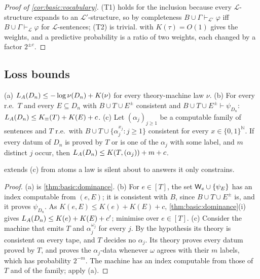 \begin{proof}[Proof of \cref{cor:basic:vocabulary}]
(T1) holds for the inclusion because every $\mathcal L$-structure expands to an $\mathcal L'$-structure, so by completeness $B\cup\Gamma\vdash_{\mathcal L'}\varphi$ iff $B\cup\Gamma\vdash_{\mathcal L}\varphi$ for $\mathcal L$-sentences; (T2) is trivial.  with $K(\tau)=O(1)$ gives the weights, and a predictive probability is a ratio of two weights, each changed by a factor $2^{\pm c}$.
\end{proof}

\subsection{Loss bounds}\label{app:basic:loss}

\begin{proposition}\label{prop:basic:exceptions}
(a) $L_{A}(D_n)\le-\log\nu(D_n)+K(\nu)$ for every theory-machine law $\nu$. (b) For every r.e.\ $T$ and every $E\subseteq D_n$ with $B\cup T\cup E^\pm$ consistent and $B\cup T\cup E^\pm\vdash\psi_{D_n}$: $L_{A}(D_n)\le K_{\equiv}(T)+K(E)+c$. (c) Let $(\alpha_j)_{j\ge1}$ be a computable family of sentences and $T$ r.e.\ with $B\cup T\cup\{\alpha_j^{x_j}:j\ge1\}$ consistent for every $x\in\{0,1\}^{\mathbb N}$. If every datum of $D_n$ is proved by $T$ or is one of the $\alpha_j$ with some label, and $m$ distinct $j$ occur, then $L_{A}(D_n)\le K(T,(\alpha_j))+m+c$.
\end{proposition}

 extends (c) from atoms a law is silent about to answers it only constrains.

\begin{proof}
(a) is \cref{thm:basic:dominance}. (b) For $e\in[T]$, the set $\mathsf{W}_{e}\cup\{\psi_E\}$ has an index computable from $(e,E)$; it is consistent with $B$, since $B\cup T\cup E^\pm$ is, and it proves $\psi_{D_n}$. As $K(e,E)\le K(e)+K(E)+c$, \cref{thm:basic:dominance}(i) gives $L_{A}(D_n)\le K(e)+K(E)+c'$; minimise over $e\in[T]$. (c) Consider the machine that emits $T$ and $\alpha_j^{\omega_j}$ for every $j$. By the hypothesis its theory is consistent on every tape, and $T$ decides no $\alpha_j$. Its theory proves every datum proved by $T$, and proves the $\alpha_j$-data whenever $\omega$ agrees with their $m$ labels, which has probability $2^{-m}$. The machine has an index computable from those of $T$ and of the family; apply (a).
\end{proof}

